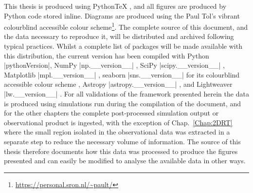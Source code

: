 This thesis is produced using PythonTeX \citep{Poore2015}, and all figures are produced by Python code stored inline.
Diagrams are produced using the Paul Tol's vibrant colourblind accessible colour scheme\footnote{\url{https://personal.sron.nl/~pault/}}.
The complete source of this document, and the data necessary to reproduce it, will be distributed and archived following typical practices.
Whilst a complete list of packages will be made available with this distribution, the current version has been compiled with Python \py[Intro]|pythonVersion|, NumPy \py[Intro]|np.__version__| \citep{Harris2020}, SciPy \py[Intro]|scipy.__version__| \citep{Virtanen2020}, Matplotlib \py[Intro]|mpl.__version__| \citep{Hunter2007}, seaborn \py[Intro]|sns.__version__| for its colourblind accessible colour scheme \citep{Waskom2021}, Astropy \py[Intro]|astropy.__version__| \citep{Robitaille2013,Price-Whelan2018}, and Lightweaver \py[Intro]|lw.__version__| \citep{Osborne2021}.
For all validations of the \Lw{} framework presented herein the data is produced using simulations run during the compilation of the document, and for the other chapters the complete post-processed simulation output or observational product is ingested, with the exception of Chap.~\ref{Chap:2DRT} where the small region isolated in the observational data was extracted in a separate step to reduce the necessary volume of information.
The source of this thesis therefore documents how this data was processed to produce the figures presented and can easily be modified to analyse the available data in other ways.

